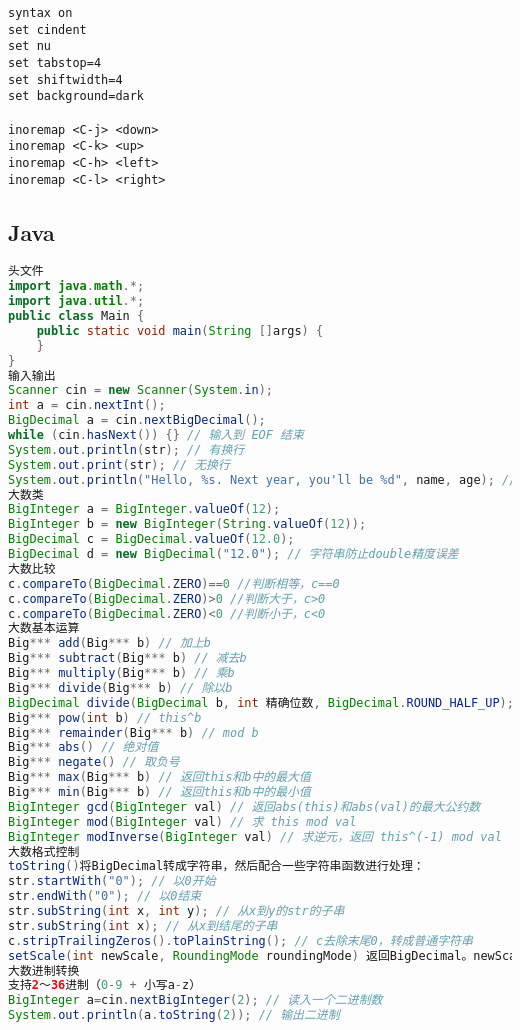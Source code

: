\documentclass[landscape,a4paper]{article}
\begin{document}
\begin{lstlisting}
syntax on
set cindent
set nu
set tabstop=4
set shiftwidth=4
set background=dark

inoremap <C-j> <down>
inoremap <C-k> <up>
inoremap <C-h> <left>
inoremap <C-l> <right>
\end{lstlisting}

\subsection{Java}

\begin{lstlisting}[language=java]
头文件
import java.math.*;
import java.util.*;
public class Main {
	public static void main(String []args) {
	}
}
输入输出
Scanner cin = new Scanner(System.in);
int a = cin.nextInt();
BigDecimal a = cin.nextBigDecimal();
while (cin.hasNext()) {} // 输入到 EOF 结束
System.out.println(str); // 有换行
System.out.print(str); // 无换行
System.out.println("Hello, %s. Next year, you'll be %d", name, age); // C风格输出
大数类
BigInteger a = BigInteger.valueOf(12);
BigInteger b = new BigInteger(String.valueOf(12));
BigDecimal c = BigDecimal.valueOf(12.0);
BigDecimal d = new BigDecimal("12.0"); // 字符串防止double精度误差
大数比较
c.compareTo(BigDecimal.ZERO)==0 //判断相等，c==0
c.compareTo(BigDecimal.ZERO)>0 //判断大于，c>0
c.compareTo(BigDecimal.ZERO)<0 //判断小于，c<0
大数基本运算
Big*** add(Big*** b) // 加上b
Big*** subtract(Big*** b) // 减去b
Big*** multiply(Big*** b) // 乘b
Big*** divide(Big*** b) // 除以b
BigDecimal divide(BigDecimal b, int 精确位数, BigDecimal.ROUND_HALF_UP); // 除以b，保留小数
Big*** pow(int b) // this^b
Big*** remainder(Big*** b) // mod b
Big*** abs() // 绝对值
Big*** negate() // 取负号
Big*** max(Big*** b) // 返回this和b中的最大值
Big*** min(Big*** b) // 返回this和b中的最小值
BigInteger gcd(BigInteger val) // 返回abs(this)和abs(val)的最大公约数
BigInteger mod(BigInteger val) // 求 this mod val
BigInteger modInverse(BigInteger val) // 求逆元，返回 this^(-1) mod val
大数格式控制
toString()将BigDecimal转成字符串，然后配合一些字符串函数进行处理：
str.startWith("0"); // 以0开始
str.endWith("0"); // 以0结束
str.subString(int x, int y); // 从x到y的str的子串
str.subString(int x); // 从x到结尾的子串
c.stripTrailingZeros().toPlainString(); // c去除末尾0，转成普通字符串
setScale(int newScale, RoundingMode roundingMode) 返回BigDecimal。newScale表示保留位数。CEILING/DOWN/FLOOR/HALF_DOWN/HALF_UP。
大数进制转换
支持2～36进制（0-9 + 小写a-z）
BigInteger a=cin.nextBigInteger(2); // 读入一个二进制数
System.out.println(a.toString(2)); // 输出二进制
\end{lstlisting}
\end{document}
